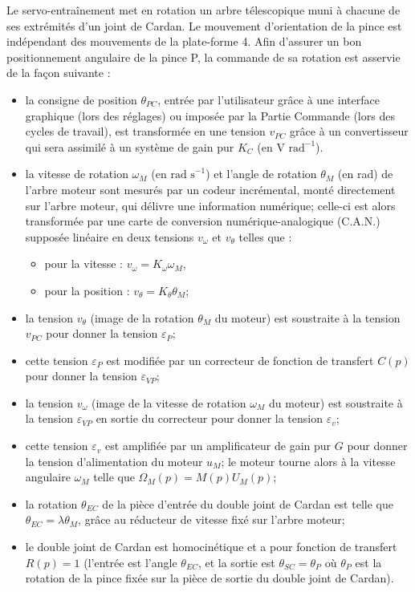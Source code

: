 \documentclass[10pt,fleqn]{article} %
\begin{document}
\begin{multicols}{2}
Le servo-entraînement met en rotation un arbre télescopique muni à chacune de ses extrémités d’un joint de Cardan. Le mouvement d’orientation de la pince est indépendant des mouvements de la plate-forme 4. 
Afin d’assurer un bon positionnement angulaire de la pince P, la commande de sa rotation est asservie de la façon suivante :
\begin{itemize}
\item la consigne de position $\theta_{PC}$, entrée par l’utilisateur grâce à une interface graphique (lors des réglages) ou imposée par la Partie Commande (lors des cycles de travail), est transformée en une tension $v_{PC}$ grâce à un convertisseur qui sera assimilé à un système de gain pur $K_C$ (en $\text{V rad}^{-1}$).
\item la vitesse de rotation $\omega_M$ (en $\text{rad s}^{-1}$) et l’angle de rotation $\theta_M$ (en rad) de l’arbre moteur sont mesurés par un codeur incrémental, monté directement sur l’arbre moteur, qui délivre une information numérique; celle-ci est alors transformée par une carte de conversion numérique-analogique (C.A.N.) supposée linéaire en deux tensions $v_{\omega}$ et $v_{\theta}$ telles que :
\begin{itemize}
\item pour la vitesse : $v_{\omega} =K_{\omega}\omega_M$,
\item pour la position : $v_{\theta} =K_{\theta}\theta_M$;
\end{itemize}
\item la tension $v_{\theta}$  (image de la rotation $\theta_M$ du moteur) est soustraite à la tension $v_{PC}$ pour donner la tension $\varepsilon_P$;
\item cette tension $\varepsilon_P$ est modifiée par un correcteur de fonction de transfert $C(p)$ pour donner la tension $\varepsilon_{VP}$;
\item la tension $v_{\omega}$ (image de la vitesse de rotation $\omega_M$ du moteur) est soustraite à la tension $\varepsilon_{VP}$ en sortie du correcteur pour donner la tension $\varepsilon_v$;
\item cette tension $\varepsilon_v$ est amplifiée par un amplificateur de gain pur $G$ pour donner la tension d’alimentation du moteur $u_M$; le moteur tourne alors à la vitesse angulaire $\omega_M$ telle que $\Omega_M(p) = M(p) U_M(p)$;
\item la rotation $\theta_{EC}$ de la pièce d’entrée du double joint de Cardan est telle que $\theta_{EC} = \lambda \theta_M$, grâce au réducteur de vitesse fixé sur l’arbre moteur;
\item le double joint de Cardan est homocinétique et a pour fonction de transfert $R(p) = 1$ (l’entrée est l’angle $\theta_{EC}$, et la sortie est $\theta_{SC}=\theta_P$ où $\theta_P$ est la rotation de la pince fixée sur la pièce de sortie du double joint de Cardan).
\end{itemize}

\end{multicols}
\end{document}
